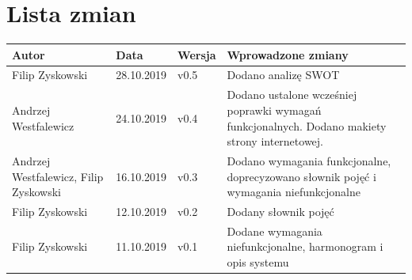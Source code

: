 \documentclass{article}
\begin{document}
\section{Lista zmian}

\begin{tabularx}{\linewidth}{|X|l|l|X|}
    \hline
    Autor & Data & Wersja & Wprowadzone zmiany \\
    \hline
    Filip Zyskowski & 28.10.2019 & v0.5 & Dodano analizę SWOT \\
    \hline
    Andrzej Westfalewicz & 24.10.2019 & v0.4 & Dodano ustalone wcześniej poprawki wymagań funkcjonalnych. Dodano makiety strony internetowej. \\
    \hline
    Andrzej Westfalewicz, Filip Zyskowski & 16.10.2019 & v0.3 & Dodano wymagania funkcjonalne, doprecyzowano słownik pojęć i wymagania niefunkcjonalne \\
    \hline
    Filip Zyskowski & 12.10.2019 & v0.2 & Dodany słownik pojęć \\
    \hline
    Filip Zyskowski & 11.10.2019 & v0.1 & Dodane wymagania niefunkcjonalne, harmonogram i opis systemu \\
    \hline
\end{tabularx}
\end{document}
